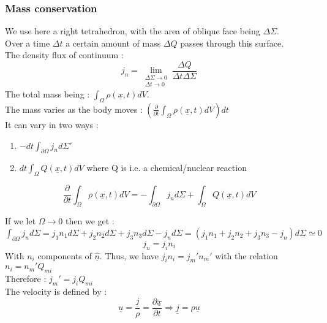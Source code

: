 \documentclass[../main.tex]{subfiles}
\begin{document}
\subsubsection{Mass conservation}
We use here a right tetrahedron, with the area of oblique face being $\Delta \Sigma$.\\
Over a time $\Delta t$ a certain amount of mass $\Delta Q$ passes through this surface. \\
The density flux of continuum :\\
\begin{equation}
    j_n = \lim_{\substack{\Delta \Sigma \to 0\\ \Delta t \to 0 } } \frac{\Delta Q}{\Delta t \Delta \Sigma}
\end{equation}
The total mass being : $\int_{\Omega} \rho(\underline{x}, t)dV$.\\
The mass varies as the body moves : $(\frac{\partial}{\partial t} \int_{\Omega} \rho(\underline{x}, t)dV)dt$\\
It can vary in two ways :\\
\begin{enumerate}
    \item $-dt \int_{\partial \Omega} j_n d\Sigma'$\\
    \item $dt \int_{\Omega} Q(\underline{x},t)dV$ where Q is i.e. a chemical/nuclear reaction\\
\end{enumerate} 
\begin{equation}
    \frac{\partial}{\partial t} \int_{\Omega} \rho(\underline{x},t)dV = -\int_{\partial \Omega} j_n d\Sigma + \int_{\Omega}Q(\underline{x},t)dV
\end{equation}

If we let $\Omega \rightarrow 0$ then we get :\\
$\int_{\partial \Omega} j_n d\Sigma = j_1n_1d\Sigma + j_2n_2d\Sigma + j_3n_3 d\Sigma - j_nd\Sigma = (j_1n_1 + j_2n_2+j_3n_3 -j_n)d\Sigma \simeq 0$\\
\begin{equation}
    j_n = j_in_i
\end{equation}
With $n_i$ components of $\hat{\underline{n}}$. Thus, we have $j_i n_i = j_m' n_m'$ with the relation $n_i = n_m' Q_{mi}$\\
Therefore : $j_m' = j_i Q_{mi}$\\
The velocity is defined by :\\
\begin{equation}
    \underline{u} = \frac{\underline{j}}{\rho} = \frac{\partial \underline{x}}{\partial t} \Rightarrow \underline{j} = \rho \underline{u}
\end{equation}
\end{document}
